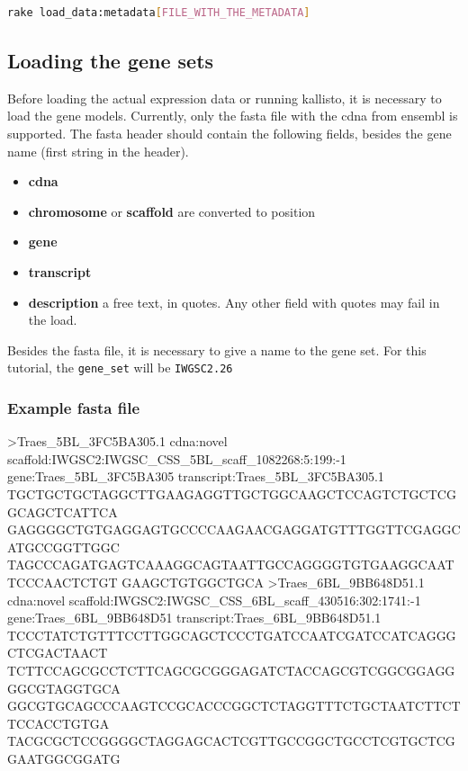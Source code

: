\begin{lstlisting}[language=sh]
rake load_data:metadata[FILE_WITH_THE_METADATA]
\end{lstlisting}

\subsection{Loading the gene sets}\label{loading-the-gene-sets}

Before loading the actual expression data or running kallisto, it is
necessary to load the gene models. Currently, only the fasta file with
the cdna from ensembl is supported. The fasta header should contain the
following fields, besides the gene name (first string in the header).

\begin{itemize}
\itemsep1pt\parskip0pt
\item
  \textbf{cdna}
\item
  \textbf{chromosome} or \textbf{scaffold} are converted to position
\item
  \textbf{gene}
\item
  \textbf{transcript}
\item
  \textbf{description} a free text, in quotes. Any other field with
  quotes may fail in the load.
\end{itemize}

Besides the fasta file, it is necessary to give a name to the gene set.
For this tutorial, the \lstinline!gene_set! will be
\lstinline!IWGSC2.26!

\subsubsection{Example fasta file}\label{example-fasta-file}

\begin{code}
>Traes_5BL_3FC5BA305.1 cdna:novel scaffold:IWGSC2:IWGSC_CSS_5BL_scaff_1082268:5:199:-1 gene:Traes_5BL_3FC5BA305 transcript:Traes_5BL_3FC5BA305.1
TGCTGCTGCTAGGCTTGAAGAGGTTGCTGGCAAGCTCCAGTCTGCTCGGCAGCTCATTCA
GAGGGGCTGTGAGGAGTGCCCCAAGAACGAGGATGTTTGGTTCGAGGCATGCCGGTTGGC
TAGCCCAGATGAGTCAAAGGCAGTAATTGCCAGGGGTGTGAAGGCAATTCCCAACTCTGT
GAAGCTGTGGCTGCA
>Traes_6BL_9BB648D51.1 cdna:novel scaffold:IWGSC2:IWGSC_CSS_6BL_scaff_430516:302:1741:-1 gene:Traes_6BL_9BB648D51 transcript:Traes_6BL_9BB648D51.1
TCCCTATCTGTTTCCTTGGCAGCTCCCTGATCCAATCGATCCATCAGGGCTCGACTAACT
TCTTCCAGCGCCTCTTCAGCGCGGGAGATCTACCAGCGTCGGCGGAGGGGCGTAGGTGCA
GGCGTGCAGCCCAAGTCCGCACCCGGCTCTAGGTTTCTGCTAATCTTCTTCCACCTGTGA
TACGCGCTCCGGGGCTAGGAGCACTCGTTGCCGGCTGCCTCGTGCTCGGAATGGCGGATG
\end{code}

